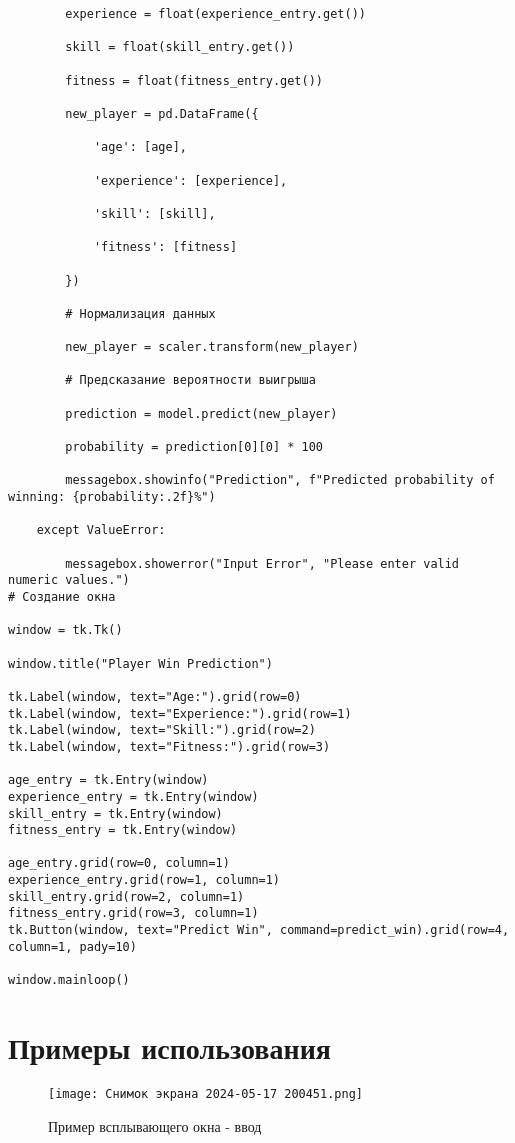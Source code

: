 \documentclass[12pt,a4paper]{article}
\begin{document}
\begin{verbatim}
        experience = float(experience_entry.get())

        skill = float(skill_entry.get())

        fitness = float(fitness_entry.get())

        new_player = pd.DataFrame({

            'age': [age],

            'experience': [experience],

            'skill': [skill],

            'fitness': [fitness]

        })

        # Нормализация данных

        new_player = scaler.transform(new_player)

        # Предсказание вероятности выигрыша

        prediction = model.predict(new_player)

        probability = prediction[0][0] * 100

        messagebox.showinfo("Prediction", f"Predicted probability of winning: {probability:.2f}%")

    except ValueError:

        messagebox.showerror("Input Error", "Please enter valid numeric values.")
# Создание окна

window = tk.Tk()

window.title("Player Win Prediction")

tk.Label(window, text="Age:").grid(row=0)
tk.Label(window, text="Experience:").grid(row=1)
tk.Label(window, text="Skill:").grid(row=2)
tk.Label(window, text="Fitness:").grid(row=3)

age_entry = tk.Entry(window)
experience_entry = tk.Entry(window)
skill_entry = tk.Entry(window)
fitness_entry = tk.Entry(window)

age_entry.grid(row=0, column=1)
experience_entry.grid(row=1, column=1)
skill_entry.grid(row=2, column=1)
fitness_entry.grid(row=3, column=1)
tk.Button(window, text="Predict Win", command=predict_win).grid(row=4, column=1, pady=10)

window.mainloop()
\end{verbatim}

\newpage

\section{Примеры использования}
\begin{figure}[!h]
\centering
\texttt{[image: Снимок экрана 2024-05-17 200451.png]}
\caption{Пример всплывающего окна - ввод}
\label{fig:example}
\end{figure}
\end{document}
